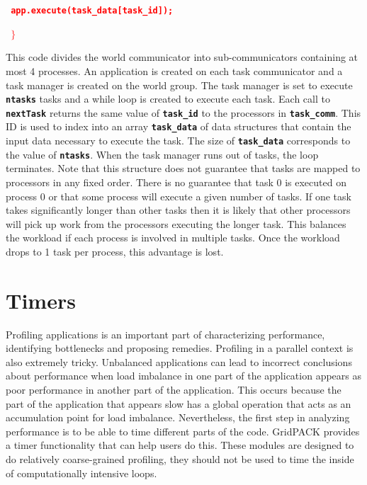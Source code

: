 \documentclass[12pt]{report} %
\begin{document}
\textcolor{red}{\texttt{\textbf{    app.execute(task\_data[task\_id]);}}}

\textcolor{red}{\texttt{\textbf{  $\boldsymbol{\mathrm{\}}}$}}}

This code divides the world communicator into sub-communicators containing at most 4 processes. An application is created on each task communicator and a task manager is created on the world group. The task manager is set to execute \texttt{\textbf{ntasks}} tasks and a while loop is created to execute each task. Each call to \texttt{\textbf{nextTask}} returns the same value of \texttt{\textbf{task\_id}} to the processors in \texttt{\textbf{task\_comm}}. This ID is used to index into an array \texttt{\textbf{task\_data}} of data structures that contain the input data necessary to execute the task. The size of \texttt{\textbf{task\_data}} corresponds to the value of \texttt{\textbf{ntasks}}. When the task manager runs out of tasks, the loop terminates. Note that this structure does not guarantee that tasks are mapped to processors in any fixed order. There is no guarantee that task 0 is executed on process 0 or that some process will execute a given number of tasks. If one task takes significantly longer than other tasks then it is likely that other processors will pick up work from the processors executing the longer task. This balances the workload if each process is involved in multiple tasks. Once the workload drops to 1 task per process, this advantage is lost.

\section{Timers}

Profiling applications is an important part of characterizing performance, identifying bottlenecks and proposing remedies. Profiling in a parallel context is also extremely tricky. Unbalanced applications can lead to incorrect conclusions about performance when load imbalance in one part of the application appears as poor performance in another part of the application. This occurs because the part of the application that appears slow has a global operation that acts as an accumulation point for load imbalance. Nevertheless, the first step in analyzing performance is to be able to time different parts of the code. GridPACK provides a timer functionality that can help users do this. These modules are designed to do relatively coarse-grained profiling, they should not be used to time the inside of computationally intensive loops.
\end{document}
